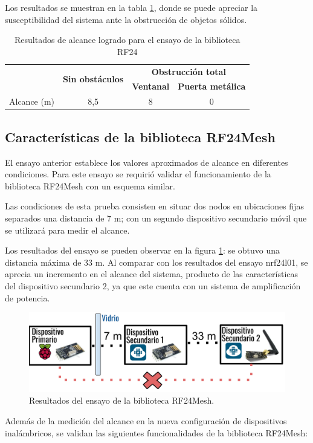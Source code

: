 Los resultados se muestran en la tabla \ref{tab:tabla_1}, donde se puede apreciar la susceptibilidad del sistema ante la obstrucción de objetos sólidos.

\begin{table}[h]
\centering
\caption[Resultados ensayo biblioteca RF24]{Resultados de alcance logrado para el ensayo de la biblioteca RF24}
\begin{tabular}{lccc}
\toprule
\textbf{}                       & \multirow{2}{*}{\textbf{Sin obstáculos}} & \multicolumn{2}{c}{\textbf{Obstrucción total}} \\
\textbf{}                       &                                          & \textbf{Ventanal}  & \textbf{Puerta metálica}  \\
\midrule
\multicolumn{1}{c}{Alcance (m)} & 8,5                                      & 8                  & 0                        
\\
\bottomrule
\hline                                                                        
\end{tabular}
\label{tab:tabla_1}
\end{table}


\subsection{Características de la biblioteca RF24Mesh}

El ensayo anterior establece los valores aproximados de alcance en diferentes condiciones. Para este ensayo se requirió validar el funcionamiento de la biblioteca RF24Mesh con un esquema similar.

Las condiciones de esta prueba consisten en situar dos nodos en ubicaciones fijas separados una distancia de 7 m; con un segundo dispositivo secundario móvil que se utilizará para medir el alcance.

Los resultados del ensayo se pueden observar en la figura \ref{fig:figura_d}: se obtuvo una distancia máxima de 33 m. Al comparar con los resultados del ensayo nrf24l01, se aprecia un incremento en el alcance del sistema, producto de las características del dispositivo secundario 2, ya que este cuenta con un sistema de amplificación de potencia.

\begin{figure}[ht]
	\centering
	\includegraphics[scale=.3]{./Figures/Capitulo4/Figura_D.png}
	\caption{Resultados del ensayo de la biblioteca RF24Mesh.}
	\label{fig:figura_d}
\end{figure}
\break
Además de la medición del alcance en la nueva configuración de dispositivos inalámbricos, se validan las siguientes funcionalidades de la biblioteca RF24Mesh:



